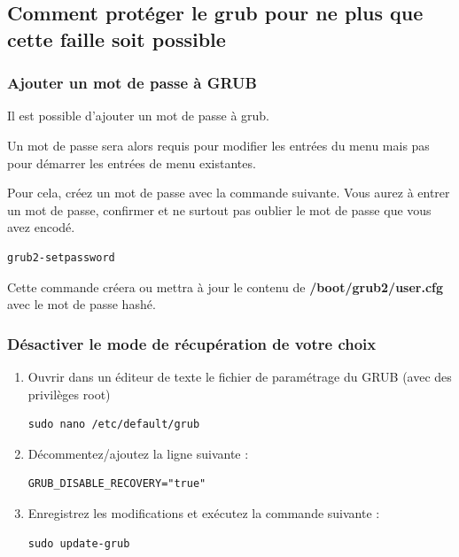 \documentclass[12pt,a4paper]{article}
\begin{document}
   \subsection{Comment protéger le grub pour ne plus que cette faille soit possible} 
        \subsubsection{Ajouter un mot de passe à GRUB} 
        \begin{flushleft}
            \noindent Il est possible d'ajouter un mot de passe à grub.
            \item Un mot de passe sera alors requis pour modifier les entrées du menu mais pas pour démarrer les entrées de menu existantes. 
            \item Pour cela, créez un mot de passe avec la commande suivante. Vous aurez à entrer un mot de passe, confirmer et ne surtout pas oublier le mot de passe que vous avez encodé.
       \begin{lstlisting}
grub2-setpassword
       \end{lstlisting}
            \item Cette commande créera ou mettra à jour le contenu de \textbf{/boot/grub2/user.cfg} avec le mot de passe hashé. \cite{Howtopro9:online}
        \end{flushleft}
        \subsubsection{Désactiver le mode de récupération de votre choix}
        \begin{enumerate}
            \item Ouvrir dans un éditeur de texte le fichier de paramétrage du GRUB (avec des privilèges root)
        \begin{lstlisting}
sudo nano /etc/default/grub
       \end{lstlisting}
            \item Décommentez/ajoutez la ligne suivante :
            \begin{lstlisting}
GRUB_DISABLE_RECOVERY="true"
            \end{lstlisting}
            \item Enregistrez les modifications et exécutez la commande suivante :
            \begin{lstlisting}
sudo update-grub
            \end{lstlisting}
        \end{enumerate}
\end{document}
